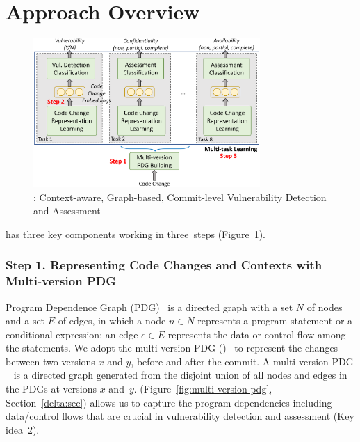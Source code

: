 \section{Approach Overview}
\label{overview:sec}

\begin{figure}[t]
	\centering
	\includegraphics[width=3.4in]{graphs/overview-4.png}
	\vspace{-16pt}
	\caption{{\tool}: Context-aware, Graph-based, Commit-level
Vulnerability Detection and Assessment}
	\label{fig:overview}
\end{figure}


\noindent {\tool} has three key components working in three~steps
(Figure~\ref{fig:overview}).


\vspace{2pt}
\subsubsection*{{\bf Step 1. Representing Code Changes and Contexts with Multi-version PDG}}
Program Dependence Graph (PDG)~\cite{pdg} is a directed graph with a
set $N$ of nodes and a set $E$ of edges, in which a node $n \in N$
represents a program statement or a conditional expression; an edge $e
\in E$ represents the data or control flow among the statements.
We adopt the multi-version PDG ({\mvpdgxy})~\cite{flexeme-fse20} to
represent the changes between two versions $x$ and $y$, before and
after the commit.  A multi-version PDG {\mvpdgxy}~\cite{flexeme-fse20}
is a directed graph generated from the disjoint union of all nodes and
edges in the PDGs at versions $x$ and~$y$. {\mvpdgxy}
(Figure~\ref{fig:multi-version-pdg}, Section~\ref{delta:sec}) allows
us to capture the program dependencies including data/control flows
that are crucial in vulnerability detection and assessment (Key
idea~2).

